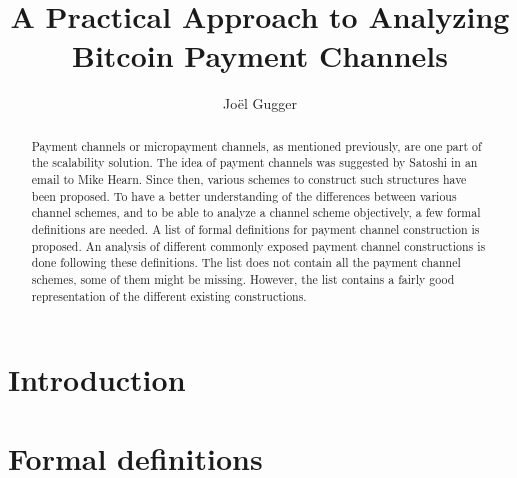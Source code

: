 \documentclass{llncs}
\begin{document}
\title{A Practical Approach to Analyzing Bitcoin Payment Channels}
\author{Jo\"el Gugger}

\maketitle

\begin{abstract} Payment channels or micropayment channels, as mentioned previously, are one part of the scalability solution. The idea of payment channels was suggested by Satoshi in an email to Mike Hearn. Since then, various schemes to construct such structures have been proposed. To have a better understanding of the differences between various channel schemes, and to be able to analyze a channel scheme objectively, a few formal definitions are needed. A list of formal definitions for payment channel construction is proposed. An analysis of different commonly exposed payment channel constructions is done following these definitions. The list does not contain all the payment channel schemes, some of them might be missing. However, the list contains a fairly good representation of the different existing constructions.
\end{abstract}

\section{Introduction}

\section{Formal definitions}
\end{document}

